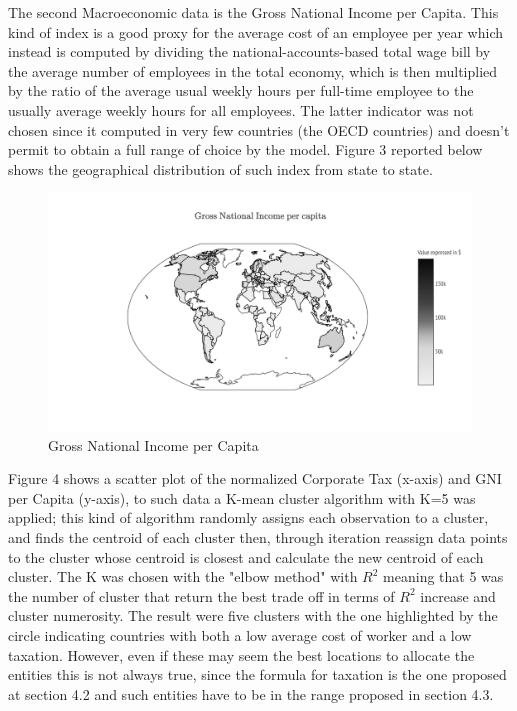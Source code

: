\begin{doublespace}
The second Macroeconomic data is the Gross National Income per Capita. This kind of index is a good proxy for the average cost of an employee per year which instead is computed by dividing the national-accounts-based total wage bill by the average number of employees in the total economy, which is then multiplied by the ratio of the average usual weekly hours per full-time employee to the usually average weekly hours for all employees. The latter indicator was not chosen since it computed in very few countries (the OECD countries) and doesn't permit to obtain a full range of choice by the model. Figure 3 reported below shows the geographical distribution of such index from state to state.
\begin{figure}
  \centering
  \includegraphics[width=1\linewidth]{Images/GNIworld.png}
  \caption{Gross National Income per Capita}
  \label{fig:test2}
\end{figure}

Figure 4 shows a scatter plot of the normalized Corporate Tax (x-axis) and GNI per Capita (y-axis), to such data a  K-mean cluster algorithm with K=5 was applied; this kind of algorithm randomly assigns each observation to a cluster, and finds the centroid of each cluster then, through iteration reassign data points to the cluster whose centroid is closest and calculate the new centroid of each cluster. The K was chosen with the "elbow method" with $R^2$ meaning that 5 was the number of cluster that return the best trade off in terms of $R^2$ increase and cluster numerosity.
The result were five clusters with the one highlighted by the circle indicating countries with both a low average cost of worker and a low taxation. However, even if these may seem the best locations to allocate the entities this is not always true, since the formula for taxation is the one proposed at section 4.2 and such entities have to be in the range proposed in section 4.3.


\end{doublespace}

